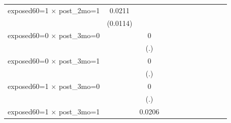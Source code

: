 \begin{table}[htbp]
\begin{tabular}{l*{11}{c}}
\addlinespace
exposed60=1 $\times$ post\_2mo=1&      0.0211         &                     &                     &                     &                     &                     &                     &                     &                     &                     &                     \\
                    &    (0.0114)         &                     &                     &                     &                     &                     &                     &                     &                     &                     &                     \\
\addlinespace
exposed60=0 $\times$ post\_3mo=0&                     &           0         &                     &                     &                     &                     &                     &                     &                     &                     &                     \\
                    &                     &         (.)         &                     &                     &                     &                     &                     &                     &                     &                     &                     \\
\addlinespace
exposed60=0 $\times$ post\_3mo=1&                     &           0         &                     &                     &                     &                     &                     &                     &                     &                     &                     \\
                    &                     &         (.)         &                     &                     &                     &                     &                     &                     &                     &                     &                     \\
\addlinespace
exposed60=1 $\times$ post\_3mo=0&                     &           0         &                     &                     &                     &                     &                     &                     &                     &                     &                     \\
                    &                     &         (.)         &                     &                     &                     &                     &                     &                     &                     &                     &                     \\
\addlinespace
exposed60=1 $\times$ post\_3mo=1&                     &      0.0206\sym{*}  &                     &                     &                     &                     &                     &                     &                     &                     &                     \\

\end{tabular}
\end{table}
